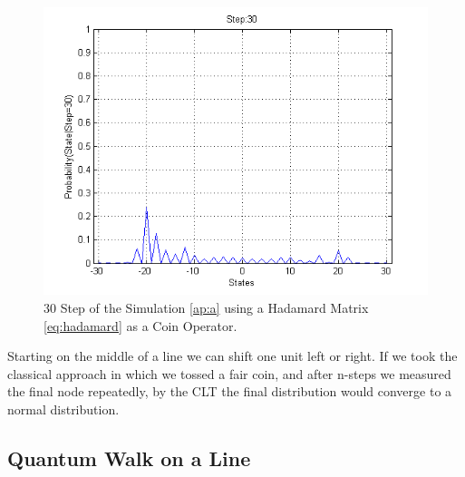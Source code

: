 \begin{figure}[h]
\centering 
\includegraphics[scale=0.50]{Figures/quantum_walk_line_hadamard.png}
\caption{30 Step of the Simulation \ref{ap:a} using a Hadamard Matrix \ref{eq:hadamard} as a Coin Operator.}
\label{fig:qwl_hadamard}
\end{figure}

Starting on the middle of a line we can shift one unit left or right.
If we took the classical approach in which we tossed a fair coin, and after n-steps we measured the final node repeatedly, by the \ac{CLT} the final distribution would converge to a normal distribution.

\subsection{Quantum Walk on a Line}
\label{subsec:quantum_walk_line}
